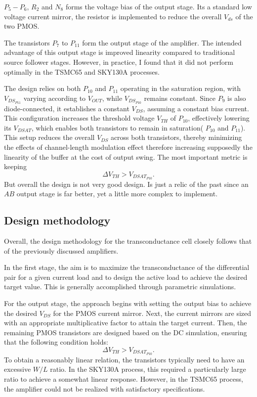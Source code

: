 \documentclass[12pt]{article}
\begin{document}
$P_5 - P_6$, $R_2$ and $N_8$ forms the voltage bias of the output stage. Its a standard low voltage current mirror, the resistor is implemented to reduce the overall $V_{ds}$ of the two PMOS.

The transistors $P_7$ to $P_{11}$ form the output stage of the amplifier. The intended advantage of this output stage is improved linearity compared to traditional source follower stages. However, in practice, I found that it did not perform optimally in the TSMC65 and SKY130A processes.

The design relies on both $P_{10}$ and $P_{11}$ operating in the saturation region, with $V_{DS_{P11}}$ varying according to $V_{OUT}$, while $V_{DS_{P10}}$ remains constant. Since $P_9$ is also diode-connected, it establishes a constant $V_{DS}$, assuming a constant bias current. This configuration increases the threshold voltage $V_{TH}$ of $P_{10}$, effectively lowering its $V_{DSAT}$, which enables both transistors to remain in saturation( $P_{10}$ and $P_{11}$). This setup reduces the overall $V_{DS}$ across both transistors, thereby minimizing the effects of channel-length modulation effect therefore increasing supposedly the linearity of the buffer at the cost of output swing.
The most important metric is keeping
\begin{equation}
    \Delta V_{TH} > V_{DSAT_{P10}}.
\end{equation}
But overall the design is not very good design. Is just  a relic of the past since an $AB$ output stage is far better, yet a little more complex to implement.


\subsection{Design methodology}
Overall, the design methodology for the transconductance cell closely follows that of the previously discussed amplifiers.

In the first stage, the aim is to maximize the transconductance of the differential pair for a given current load and to design the active load to achieve the desired target value. This is generally accomplished through parametric simulations.

For the output stage, the approach begins with setting the output bias to achieve the desired $V_{DS}$ for the PMOS current mirror. Next, the current mirrors are sized with an appropriate multiplicative factor to attain the target current. Then, the remaining PMOS transistors are designed based on the DC simulation, ensuring that the following condition holds:
\begin{equation}
    \Delta V_{TH} > V_{DSAT_{P10}}.
\end{equation}
To obtain a reasonably linear relation, the transistors typically need to have an excessive \( W/L \) ratio. In the SKY130A process, this required a particularly large ratio to achieve a somewhat linear response. However, in the \ac{TSMC65} process, the amplifier could not be realized with satisfactory specifications.
\end{document}
